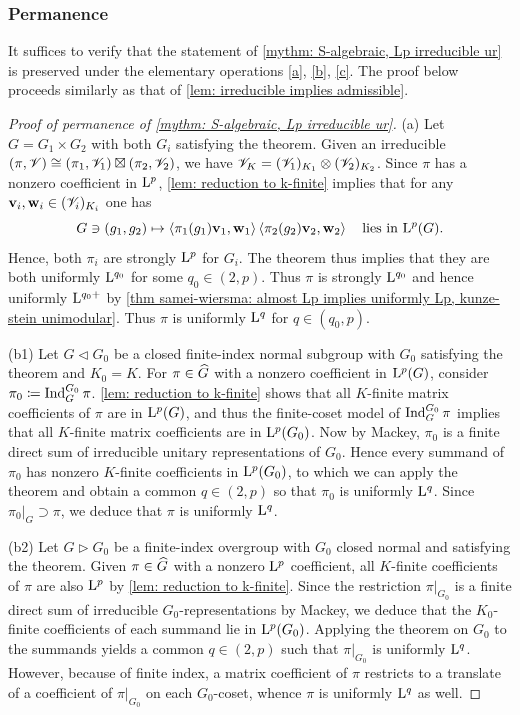 \documentclass[a4paper, 10pt]{article}
\begin{document}
\subsubsection*{Permanence}
It suffices to verify that the statement of \autoref{mythm: S-algebraic, Lp irreducible ur} is preserved under the elementary operations \ref{a}, \ref{b}, \ref{c}.
The proof below proceeds similarly as that of \autoref{lem: irreducible implies admissible}.
\begin{proof}[Proof of permanence of \autoref{mythm: S-algebraic, Lp irreducible ur}]
    (a) Let $G=G_1\times G_2$ with both $G_i$ satisfying the theorem. Given an irreducible $(\pi, \mathscr{V})\cong (\pi_1,\mathscr{V}_1)\boxtimes (\pi_2,\mathscr{V}_2)$, we have $\mathscr{V}_K = (\mathscr{V}_1)_{K_1} \otimes (\mathscr{V}_2)_{K_2}$.
    Since $\pi$ has a nonzero coefficient in $\mathrm{L}^p$, \autoref{lem: reduction to k-finite} implies that for any $\mathbf{v}_i,\mathbf{w}_i\in(\mathscr{V}_i)_{K_i}$ one has
    \begin{equation*}
        G\ni (g_1, g_2) \mapsto \left\langle\pi_1(g_1)\mathbf{v}_1,\mathbf{w}_1 \right\rangle \left\langle\pi_2(g_2)\mathbf{v}_2,\mathbf{w}_2 \right\rangle  \quad\text{lies in $\mathrm{L}^p(G)$}.
    \end{equation*}
    Hence, both $\pi_i$ are strongly $\mathrm{L}^p$ for $G_i$. The theorem thus implies that they are both uniformly $\mathrm{L}^{q_0}$ for some $q_0\in(2,p)$. Thus $\pi$ is strongly $\mathrm{L}^{q_0}$ and hence uniformly $\mathrm{L}^{q_0+}$ by \autoref{thm samei-wiersma: almost Lp implies uniformly Lp, kunze-stein unimodular}. Thus $\pi$ is uniformly $\mathrm{L}^q$ for $q\in(q_0, p)$.

    (b1) Let $G\lhd G_0$ be a closed finite-index normal subgroup with $G_0$ satisfying the theorem and $K_0=K$. For $\pi\in\widehat{G}$ with a nonzero coefficient in $\mathrm{L}^p(G)$, consider $\pi_0\coloneq \operatorname{Ind}_G^{G_0}\pi$. 
    \autoref{lem: reduction to k-finite} shows that all $K$-finite matrix coefficients of $\pi$ are in $\mathrm{L}^p(G)$, and thus the finite-coset model of $\operatorname{Ind}_G^{G_0}\pi$ implies that all $K$-finite matrix coefficients are in $\mathrm{L}^p(G_0)$.
    Now by Mackey, $\pi_0$ is a finite direct sum of irreducible unitary representations of $G_0$.
    Hence every summand of $\pi_0$ has nonzero $K$-finite coefficients in $\mathrm{L}^p(G_0)$, to which we can apply the theorem and obtain a common $q\in (2,p)$ so that $\pi_0$ is uniformly $\mathrm{L}^q$. Since $\pi_0|_{G}\supset \pi$, we deduce that $\pi$ is uniformly $\mathrm{L}^q$.

    (b2) Let $G\rhd G_0$ be a finite-index overgroup with $G_0$ closed normal and satisfying the theorem. Given $\pi\in\widehat{G}$ with a nonzero $\mathrm{L}^p$ coefficient, all $K$-finite coefficients of $\pi$ are also $\mathrm{L}^p$ by \autoref{lem: reduction to k-finite}.
    Since the restriction $\pi|_{G_0}$ is a finite direct sum of irreducible $G_0$-representations by Mackey, we deduce that the $K_0$-finite coefficients of each summand lie in $\mathrm{L}^p(G_0)$.
    Applying the theorem on $G_0$ to the summands yields a common $q\in (2,p)$ such that $\pi|_{G_0}$ is uniformly $\mathrm{L}^q$.
    However, because of finite index, a matrix coefficient of $\pi$ restricts to a translate of a coefficient of $\pi|_{G_0}$ on each $G_0$-coset, whence $\pi$ is uniformly $\mathrm{L}^q$ as well.


\end{proof}
\end{document}
